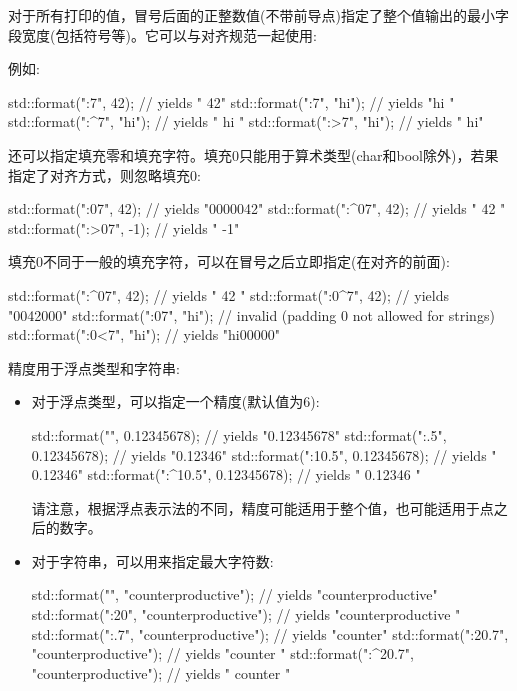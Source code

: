 
对于所有打印的值，冒号后面的正整数值(不带前导点)指定了整个值输出的最小字段宽度(包括符号等)。它可以与对齐规范一起使用:

例如:

\begin{cpp}
std::format("{:7}", 42);     // yields "           42"
std::format("{:7}", "hi");   // yields "hi           "
std::format("{:^7}", "hi");  // yields "      hi     "
std::format("{:>7}", "hi");  // yields "           hi"
\end{cpp}

还可以指定填充零和填充字符。填充0只能用于算术类型(char和bool除外)，若果指定了对齐方式，则忽略填充0:

\begin{cpp}
std::format("{:07}", 42);    // yields "0000042"
std::format("{:^07}", 42);   // yields "  42   "
std::format("{:>07}", -1);   // yields "     -1"
\end{cpp}

填充0不同于一般的填充字符，可以在冒号之后立即指定(在对齐的前面):

\begin{cpp}
std::format("{:^07}", 42);   // yields "  42   "
std::format("{:0^7}", 42);   // yields "0042000"
std::format("{:07}", "hi");  // invalid (padding 0 not allowed for strings)
std::format("{:0<7}", "hi"); // yields "hi00000"
\end{cpp}

精度用于浮点类型和字符串:

\begin{itemize}
\item 
对于浮点类型，可以指定一个精度(默认值为6):

\begin{cpp}
std::format("{}", 0.12345678);         // yields "0.12345678"
std::format("{:.5}", 0.12345678);      // yields "0.12346"
std::format("{:10.5}", 0.12345678);    // yields "   0.12346"
std::format("{:^10.5}", 0.12345678);   // yields " 0.12346  "
\end{cpp}

请注意，根据浮点表示法的不同，精度可能适用于整个值，也可能适用于点之后的数字。

\item 
对于字符串，可以用来指定最大字符数:

\begin{cpp}
std::format("{}", "counterproductive");            // yields "counterproductive"
std::format("{:20}", "counterproductive");         // yields "counterproductive    "
std::format("{:.7}", "counterproductive");         // yields "counter"
std::format("{:20.7}", "counterproductive");       // yields "counter              "
std::format("{:^20.7}", "counterproductive");      // yields "        counter      "
\end{cpp}
\end{itemize}

